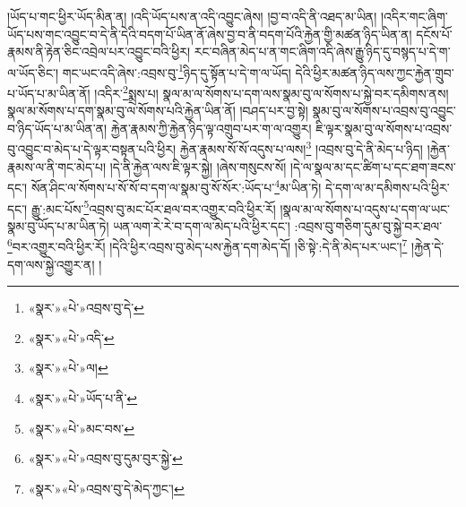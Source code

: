 །ཡོད་པ་གང་ཕྱིར་ཡོད་མིན་ན། །འདི་ཡོད་པས་ན་འདི་འབྱུང་ཞེས། །བྱ་བ་འདི་ནི་འཐད་མ་ཡིན། །འདིར་གང་ཞིག་ཡོད་པས་གང་འབྱུང་བ་དེ་ནི་དེའི་བདག་པོ་ཡིན་ནོ་ཞེས་བྱ་བ་ནི་བདག་པོའི་རྐྱེན་གྱི་མཚན་ཉིད་ཡིན་ན། དངོས་པོ་རྣམས་ནི་རྟེན་ཅིང་འབྲེལ་པར་འབྱུང་བའི་ཕྱིར། རང་བཞིན་མེད་པ་ན་གང་ཞིག་འདི་ཞེས་རྒྱུ་ཉིད་དུ་བསྙད་པ་དེ་ག་ལ་ཡོད་ཅིང་། གང་ཡང་འདི་ཞེས་:འབྲས་བུ་\footnote{«སྣར་»«པེ་»འབྲས་བུ་དེ་}ཉིད་དུ་སྟོན་པ་དེ་ག་ལ་ཡོད། དེའི་ཕྱིར་མཚན་ཉིད་ལས་ཀྱང་རྐྱེན་གྲུབ་པ་ཡོད་པ་མ་ཡིན་ནོ། །འདིར་\footnote{«སྣར་»«པེ་»འདི་}སྨྲས་པ། སྣལ་མ་ལ་སོགས་པ་དག་ལས་སྣམ་བུ་ལ་སོགས་པ་སྐྱེ་བར་དམིགས་ནས། སྣལ་མ་སོགས་པ་དག་སྣམ་བུ་ལ་སོགས་པའི་རྐྱེན་ཡིན་ནོ། །བཤད་པར་བྱ་སྟེ། སྣམ་བུ་ལ་སོགས་པ་འབྲས་བུ་འབྱུང་བ་ཉིད་ཡོད་པ་མ་ཡིན་ན། རྐྱེན་རྣམས་ཀྱི་རྐྱེན་ཉིད་ལྟ་འགྲུབ་པར་ག་ལ་འགྱུར། ཇི་ལྟར་སྣམ་བུ་ལ་སོགས་པ་འབྲས་བུ་འབྱུང་བ་མེད་པ་དེ་ལྟར་བསྟན་པའི་ཕྱིར། རྐྱེན་རྣམས་སོ་སོ་འདུས་པ་ལས།\footnote{«སྣར་»«པེ་»ལ།} །འབྲས་བུ་དེ་ནི་མེད་པ་ཉིད། །རྐྱེན་རྣམས་ལ་ནི་གང་མེད་པ། །དེ་ནི་རྐྱེན་ལས་ཇི་ལྟར་སྐྱེ། །ཞེས་གསུངས་སོ། །དེ་ལ་སྣལ་མ་དང་ཚིག་པ་དང་ཐག་ཟངས་དང་། སོན་ཤིང་ལ་སོགས་པ་སོ་སོ་བ་དག་ལ་སྣམ་བུ་སོ་སོར་:ཡོད་པ་\footnote{«སྣར་»«པེ་»ཡོད་པ་ནི་}མ་ཡིན་ཏེ། དེ་དག་ལ་མ་དམིགས་པའི་ཕྱིར་དང་། རྒྱུ་:མང་པོས་\footnote{«སྣར་»«པེ་»མང་བས་}འབྲས་བུ་མང་པོར་ཐལ་བར་འགྱུར་བའི་ཕྱིར་རོ། །སྣལ་མ་ལ་སོགས་པ་འདུས་པ་དག་ལ་ཡང་སྣམ་བུ་ཡོད་པ་མ་ཡིན་ཏེ། ཡན་ལག་རེ་རེ་བ་དག་ལ་མེད་པའི་ཕྱིར་དང་། :འབྲས་བུ་གཅིག་དུམ་བུ་སྐྱེ་བར་ཐལ་\footnote{«སྣར་»«པེ་»འབྲས་བུ་དུམ་བུར་སྐྱེ་}བར་འགྱུར་བའི་ཕྱིར་རོ། །དེའི་ཕྱིར་འབྲས་བུ་མེད་པས་རྐྱེན་དག་མེད་དོ། །ཅི་སྟེ་:དེ་ནི་མེད་པར་ཡང་།\footnote{«སྣར་»«པེ་»འབྲས་བུ་དེ་མེད་ཀྱང་།} །རྐྱེན་དེ་དག་ལས་སྐྱེ་འགྱུར་ན། །
